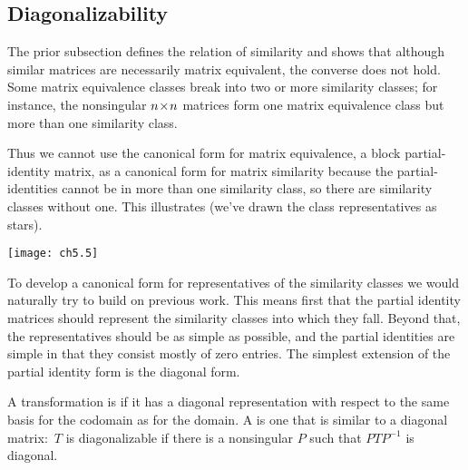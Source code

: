 \subsection{Diagonalizability}
The prior subsection defines the relation of similarity and shows that
although similar matrices are necessarily matrix equivalent, the converse
does not hold.
Some matrix equivalence classes break into two or more similarity 
classes; for instance, the nonsingular $n \! \times \! n$ matrices
form one matrix equivalence class but more than one similarity class.

Thus we cannot use the canonical form for matrix equivalence, 
a block partial-identity matrix, as a canonical form 
for matrix similarity because
the partial-identities cannot be in more than one
similarity class, so there are similarity classes without one.
This illustrates 
(we've drawn the class representatives as stars).
\begin{center}
  \texttt{[image: ch5.5]}
\end{center}
To develop a canonical form for representatives of
the similarity classes
we would naturally try to build on previous work.
This means 
first that the partial identity matrices should represent the similarity
classes into which they fall. 
Beyond that, the representatives should be as simple as possible, and
the partial identities are simple in that they consist mostly of zero entries. 
The simplest extension of the partial identity form is the diagonal form.

\begin{definition}
A transformation is %
if it has a diagonal representation
with respect to the same basis for the codomain as for the domain.
A 
is one that is similar to a diagonal matrix:~\( T \) is diagonalizable
if there is a nonsingular \( P \) such that \( PTP^{-1} \) is diagonal.
\end{definition}

